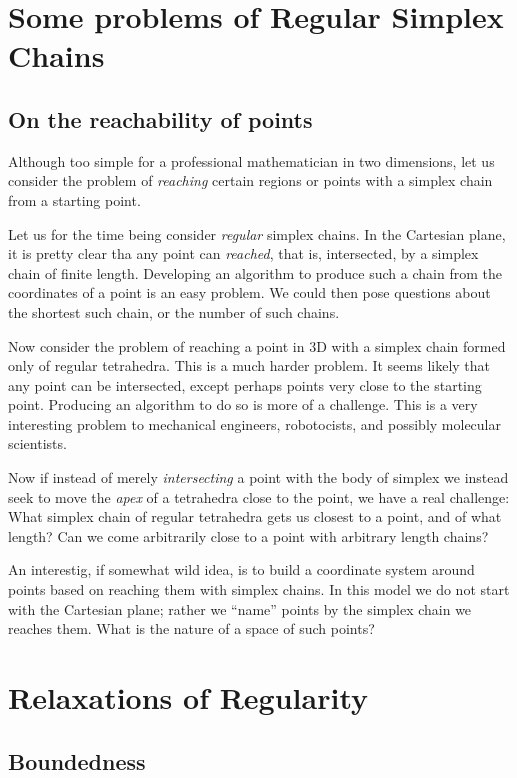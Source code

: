 \documentclass[11pt]{article}
\begin{document}
\section{Some problems of Regular Simplex Chains}

\subsection{On the reachability of points}

Although too simple for a professional mathematician in two dimensions, let us consider the problem of {\em reaching} certain regions
or points with a simplex chain from a starting point.

Let us for the time being consider {\em regular} simplex chains.  In the Cartesian plane, it is pretty clear tha any point can {\em reached},
that is, intersected, by a simplex chain of finite length. Developing an algorithm to produce such a chain from the coordinates of a point
is an easy problem. We could then pose questions about the shortest such chain, or the number of such chains.

Now consider the problem of reaching a point in 3D with a simplex chain formed only of regular tetrahedra. This is a much harder problem.
It seems likely that any point can be intersected, except perhaps points very close to the starting point. Producing an algorithm to do so
is more of a challenge. This is a very interesting problem to mechanical engineers, robotocists, and possibly molecular scientists.

Now if instead of merely {\em intersecting} a point with the body of simplex we instead seek to move the {\em apex} of a tetrahedra close
to the point, we have a real challenge: What simplex chain of regular tetrahedra gets us closest to a point, and of what length? Can
we come arbitrarily close to a point with arbitrary length chains?

An interestig, if somewhat wild idea, is to build a coordinate system around points based on reaching them with simplex chains. In this model
we do not start with the Cartesian plane; rather we ``name'' points by the simplex chain we reaches them. What is the nature of a space
of such points? 



\section{Relaxations of Regularity}
\subsection{Boundedness}
\end{document}
